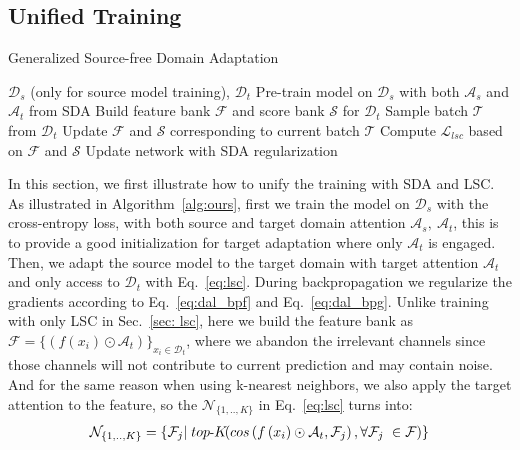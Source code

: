 \documentclass[10pt,twocolumn,letterpaper]{article}
\begin{document}
\subsection{Unified Training}
\begin{algorithm}[tbp]
\small
	\caption{Generalized Source-free Domain Adaptation}
	\label{alg:ours}
	\begin{algorithmic}[1]
		\Require $\mathcal{D}_s$ (only for source model training), $\mathcal{D}_t$ \State Pre-train model on $\mathcal{D}_s$ with both $\mathcal{A}_s$ and $\mathcal{A}_t$ from SDA
		\State Build feature bank $\mathcal{F}$ and score bank $\mathcal{S}$ for $\mathcal{D}_t$
		\State Sample batch $\mathcal{T}$ from $\mathcal{D}_t$ 
		\State Update $\mathcal{F}$ and $\mathcal{S}$ corresponding to current batch $\mathcal{T}$
		\State Compute $\mathcal{L}_{lsc}$ based on $\mathcal{F}$ and $\mathcal{S}$
		\State Update network with SDA regularization
		\EndWhile 

	\end{algorithmic}
\end{algorithm}
\vspace{-2mm}

In this section, we first illustrate how to unify the training with SDA and LSC. As illustrated in Algorithm~\ref{alg:ours}, first we train the model on $\mathcal{D}_s$ with the cross-entropy loss, with both source and target domain attention $\mathcal{A}_s,\: \mathcal{A}_t$, this is to provide a good initialization for target adaptation where only $\mathcal{A}_t$ is engaged. Then, we adapt the source model to the target domain with target attention $\mathcal{A}_t$ and only access to $\mathcal{D}_t$ with Eq.~\ref{eq:lsc}. During backpropagation we regularize the gradients according to Eq.~\ref{eq:dal_bpf} and Eq.~\ref{eq:dal_bpg}. Unlike training with only LSC in Sec.~\ref{sec: lsc}, here we build the feature bank as $\mathcal{F}=\{(f(x_i)\odot \mathcal{A}_t)\}_{x_i \in \mathcal{D}_t}$, where we abandon the irrelevant channels since those channels will not contribute to current prediction and may contain noise. And for the same reason when using k-nearest neighbors, we also apply the target attention to the feature, so the $\mathcal{N}_{\{1,..,K\}}$ in Eq.~\ref{eq:lsc} turns into:
\begin{equation}\label{eq:near}
\begin{gathered}
\small
\mathcal{N}_{\{1,..,K\}}=\{\mathcal{F}_j | \;top\textrm{-}K\!\! \left(cos\left(f\left(x_i\right)\odot\mathcal{A}_t,\mathcal{F}_j\right),  \forall \mathcal{F}_j\ \in \mathcal{F}\right) \}
\end{gathered}
\end{equation}
\end{document}
